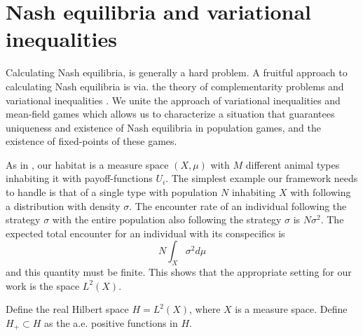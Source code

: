 \section{Nash equilibria and variational inequalities}
Calculating Nash equilibria,  is generally a hard problem. A fruitful approach to calculating Nash equilibria is via. the theory of complementarity problems and variational inequalities \citep{karamardian1969nonlinear,nabetani2011parametrized}. We unite the approach of variational inequalities and mean-field games which allows us to characterize a situation that guarantees uniqueness and existence of Nash equilibria in population games, and the existence of fixed-points of these games.


As in , our habitat is a measure space $(X,\mu)$ with $M$ different animal types inhabiting it with payoff-functions $U_i$. The simplest example our framework needs to handle is that of a single type with population $N$ inhabiting $X$ with following a distribution with density $\sigma$. The encounter rate of an individual following the strategy $\sigma$ with the entire population also following the strategy $\sigma$ is $N\sigma^2$. The expected total encounter for an individual with its conspecifics is
\begin{equation}
  N\int_X \sigma^2 d\mu
\end{equation}
and this quantity must be finite. This shows that the appropriate setting for our work is the space $L^2(X)$.
\begin{definition}
  Define the real Hilbert space $H=L^2(X)$, where $X$ is a measure space. Define $H_+ \subset H$ as the a.e. positive functions in $H$.
\end{definition}

